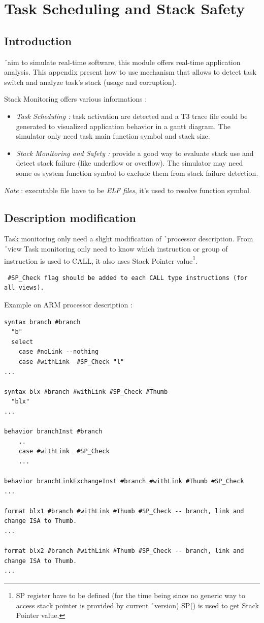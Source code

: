 \chapter{Task Scheduling and Stack Safety}
\section{Introduction}
\h\ aim to simulate real-time software, this module offers real-time application analysis. This appendix present how to use mechanism that allows to detect task switch and analyze task's stack (usage and corruption).

\noindent Stack Monitoring offers various informations :
\begin{itemize}
	\item \emph{Task Scheduling : }task activation are detected and a T3 trace file could be generated to visualized application behavior in a gantt diagram. The simulator only need task main function symbol and stack size.
	\item \emph{Stack Monitoring and Safety :} provide a good way to evaluate stack use and detect stack failure (like underflow or overflow). The simulator may need some os system function symbol to exclude them from stack failure detection.
\end{itemize}

\emph{Note} : executable file have to be \emph{ELF files}, it's used to resolve function symbol.
\section{Description modification}


Task monitoring only need a slight modification of \h\ processor description. From \h\ view Task monitoring only need to know which instruction or group of instruction is used to CALL, it also uses Stack Pointer value\footnote{SP register have to be defined (for the time being since no generic way to access stack pointer is provided by current \h\ version) SP() is used to get Stack Pointer value.}.

\begin{verbatim} 
 #SP_Check flag should be added to each CALL type instructions (for all views).
\end{verbatim}

\noindent Example on ARM processor description :
\begin{lstlisting}
syntax branch #branch
  "b"
  select
    case #noLink --nothing
    case #withLink  #SP_Check "l"
...

syntax blx #branch #withLink #SP_Check #Thumb 
  "blx"
...

behavior branchInst #branch
    ..
    case #withLink  #SP_Check
	...
	
behavior branchLinkExchangeInst #branch #withLink #Thumb #SP_Check
...

format blx1 #branch #withLink #Thumb #SP_Check -- branch, link and change ISA to Thumb.
...

format blx2 #branch #withLink #Thumb #SP_Check -- branch, link and change ISA to Thumb.
...
 \end{lstlisting}

